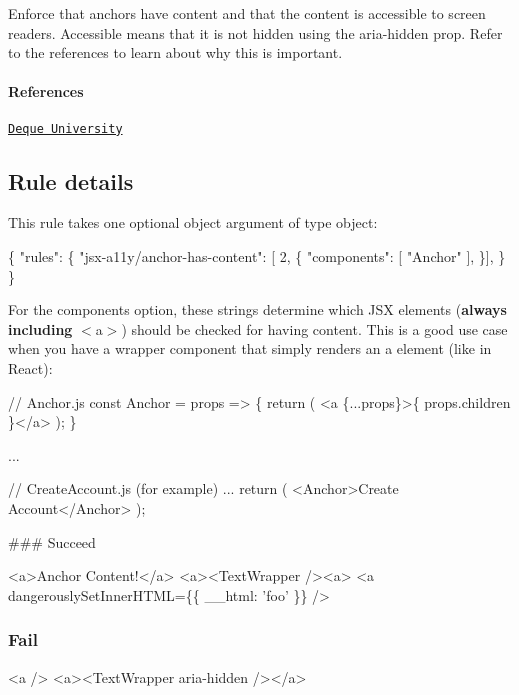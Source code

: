 Enforce that anchors have content and that the content is accessible to screen readers. Accessible means that it is not hidden using the {\ttfamily aria-\/hidden} prop. Refer to the references to learn about why this is important.

\paragraph*{References}


\begin{DoxyEnumerate}
\item \href{https://dequeuniversity.com/rules/axe/1.1/link-name}{\tt Deque University}
\end{DoxyEnumerate}

\subsection*{Rule details}

This rule takes one optional object argument of type object\+:


\begin{DoxyCode}
\{
    "rules": \{
        "jsx-a11y/anchor-has-content": [ 2, \{
            "components": [ "Anchor" ],
          \}],
    \}
\}
\end{DoxyCode}


For the {\ttfamily components} option, these strings determine which J\+SX elements ({\bfseries always including} {\ttfamily $<$a$>$}) should be checked for having content. This is a good use case when you have a wrapper component that simply renders an {\ttfamily a} element (like in React)\+:


\begin{DoxyCode}
// Anchor.js
const Anchor = props => \{
  return (
    <a \{...props\}>\{ props.children \}</a>
  );
\}

...

// CreateAccount.js (for example)
...
return (
  <Anchor>Create Account</Anchor>
);
\end{DoxyCode}


\#\#\# Succeed 
\begin{DoxyCode}
<a>Anchor Content!</a>
<a><TextWrapper /><a>
<a dangerouslySetInnerHTML=\{\{ \_\_html: 'foo' \}\} />
\end{DoxyCode}


\subsubsection*{Fail}


\begin{DoxyCode}
<a />
<a><TextWrapper aria-hidden /></a>
\end{DoxyCode}
 